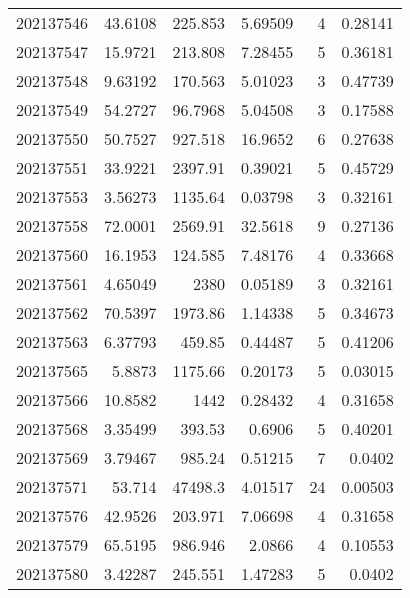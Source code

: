 \begin{tabular}{rrrrrr}
 202137546 &         43.6108  &      225.853  &            5.69509 &           4 & 0.28141 \\
 202137547 &         15.9721  &      213.808  &            7.28455 &           5 & 0.36181 \\
 202137548 &          9.63192 &      170.563  &            5.01023 &           3 & 0.47739 \\
 202137549 &         54.2727  &       96.7968 &            5.04508 &           3 & 0.17588 \\
 202137550 &         50.7527  &      927.518  &           16.9652  &           6 & 0.27638 \\
 202137551 &         33.9221  &     2397.91   &            0.39021 &           5 & 0.45729 \\
 202137553 &          3.56273 &     1135.64   &            0.03798 &           3 & 0.32161 \\
 202137558 &         72.0001  &     2569.91   &           32.5618  &           9 & 0.27136 \\
 202137560 &         16.1953  &      124.585  &            7.48176 &           4 & 0.33668 \\
 202137561 &          4.65049 &     2380      &            0.05189 &           3 & 0.32161 \\
 202137562 &         70.5397  &     1973.86   &            1.14338 &           5 & 0.34673 \\
 202137563 &          6.37793 &      459.85   &            0.44487 &           5 & 0.41206 \\
 202137565 &          5.8873  &     1175.66   &            0.20173 &           5 & 0.03015 \\
 202137566 &         10.8582  &     1442      &            0.28432 &           4 & 0.31658 \\
 202137568 &          3.35499 &      393.53   &            0.6906  &           5 & 0.40201 \\
 202137569 &          3.79467 &      985.24   &            0.51215 &           7 & 0.0402  \\
 202137571 &         53.714   &    47498.3    &            4.01517 &          24 & 0.00503 \\
 202137576 &         42.9526  &      203.971  &            7.06698 &           4 & 0.31658 \\
 202137579 &         65.5195  &      986.946  &            2.0866  &           4 & 0.10553 \\
 202137580 &          3.42287 &      245.551  &            1.47283 &           5 & 0.0402  \\

\end{tabular}
